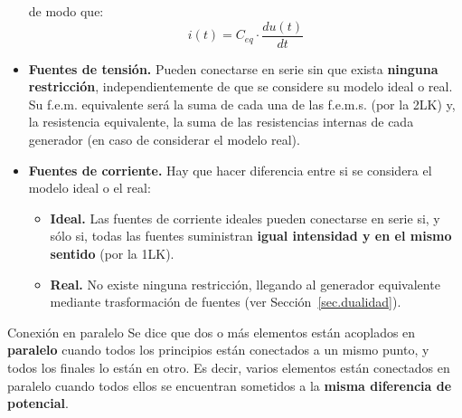 \documentclass[11pt]{book} %
\makeatletter
\numberwithin{dummy}{section}
\theoremstyle{ocrenumbox}
\theoremstyle{blacknumex}
\theoremstyle{blacknumbox}
\theoremstyle{ocrenum}
\renewcommand{\subsubsection}{\@startsection {subsubsection}{3}{\z@}
{-2ex \@plus -0.1ex \@minus -.2ex}
{.2ex \@plus.2ex }
{\normalfont\small\sffamily\bfseries}}
\makeatother
\begin{document}
\begin{itemize}
\begin{equation}
		\end{equation}
		de modo que:
		\begin{equation*}
			i(t) = C_{eq} \cdot \frac{du(t)}{dt}
		\end{equation*}
		\item \textbf{Fuentes de tensión.} Pueden conectarse en serie sin que exista \textbf{ninguna restricción}, independientemente de que se considere su modelo ideal o real. Su f.e.m. equivalente será la suma de cada una de las f.e.m.s. (por la 2LK) y, la resistencia equivalente, la suma de las resistencias internas de cada generador (en caso de considerar el modelo real).
		\item \textbf{Fuentes de corriente.} Hay que hacer diferencia entre si se considera el modelo ideal o el real:
		\begin{itemize}
			\item \textbf{Ideal.} Las fuentes de corriente ideales pueden conectarse en serie si, y sólo si, todas las fuentes suministran \textbf{igual intensidad y en el mismo sentido} (por la 1LK).
			\item \textbf{Real.} No existe ninguna restricción, llegando al generador equivalente mediante trasformación de fuentes (ver Sección~\ref{sec.dualidad}). 
		\end{itemize}
	\end{itemize}
	
	\subsubsection{Conexión en paralelo}
	Se dice que dos o más elementos están acoplados en \textbf{paralelo} cuando todos los principios están conectados a un mismo punto, y todos los finales lo están en otro. Es decir, varios elementos están conectados en paralelo cuando todos ellos se encuentran sometidos a la \textbf{misma diferencia de potencial}.
	
\end{document}
